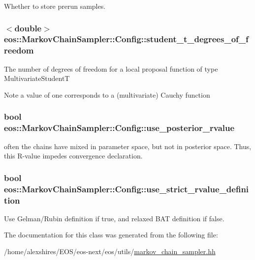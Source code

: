Whether to store prerun samples. \hypertarget{classeos_1_1MarkovChainSampler_1_1Config_a7a3619bea51ea7edeb15dc2e8c614213}{
\subsubsection[{student\_\-t\_\-degrees\_\-of\_\-freedom}]{$<$double$>$ {\bf eos::MarkovChainSampler::Config::student\_\-t\_\-degrees\_\-of\_\-freedom}}}
\label{classeos_1_1MarkovChainSampler_1_1Config_a7a3619bea51ea7edeb15dc2e8c614213}
The number of degrees of freedom for a local proposal function of type MultivariateStudentT \begin{DoxyNote}{Note}
a value of one corresponds to a (multivariate) Cauchy function 
\end{DoxyNote}
\hypertarget{classeos_1_1MarkovChainSampler_1_1Config_a1243022c46d489f741762e90aeb1ca31}{
\subsubsection[{use\_\-posterior\_\-rvalue}]{\setlength{\rightskip}{0pt plus 5cm}bool {\bf eos::MarkovChainSampler::Config::use\_\-posterior\_\-rvalue}}}
\label{classeos_1_1MarkovChainSampler_1_1Config_a1243022c46d489f741762e90aeb1ca31}
often the chains have mixed in parameter space, but not in posterior space. Thus, this R-\/value impedes convergence declaration. \hypertarget{classeos_1_1MarkovChainSampler_1_1Config_a489bcbea5b78163dbfde22225b980d8c}{
\subsubsection[{use\_\-strict\_\-rvalue\_\-definition}]{\setlength{\rightskip}{0pt plus 5cm}bool {\bf eos::MarkovChainSampler::Config::use\_\-strict\_\-rvalue\_\-definition}}}
\label{classeos_1_1MarkovChainSampler_1_1Config_a489bcbea5b78163dbfde22225b980d8c}
Use Gelman/Rubin definition if true, and relaxed BAT definition if false. 

The documentation for this class was generated from the following file:\begin{DoxyCompactItemize}
\item 
/home/alexshires/EOS/eos-\/next/eos/utils/\hyperlink{markov__chain__sampler_8hh}{markov\_\-chain\_\-sampler.hh}\end{DoxyCompactItemize}
